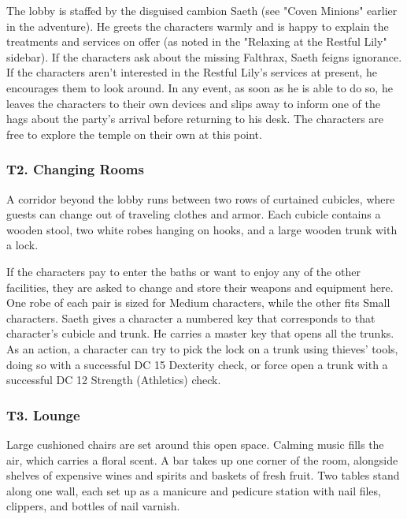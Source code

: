 \documentclass[10pt,a4paper,twoside,bg=print,twocolumn,openany,nodeprecatedcode]{dndbook}
\begin{document}
The lobby is staffed by the disguised cambion Saeth (see "Coven Minions" earlier in the adventure). He greets the characters warmly and is happy to explain the treatments and services on offer (as noted in the "Relaxing at the Restful Lily" sidebar). If the characters ask about the missing Falthrax, Saeth feigns ignorance. If the characters aren't interested in the Restful Lily's services at present, he encourages them to look around. In any event, as soon as he is able to do so, he leaves the characters to their own devices and slips away to inform one of the hags about the party's arrival before returning to his desk. The characters are free to explore the temple on their own at this point.

\subsubsection{T2. Changing Rooms}
\begin{DndReadAloud}{}
A corridor beyond the lobby runs between two rows of curtained cubicles, where guests can change out of traveling clothes and armor. Each cubicle contains a wooden stool, two white robes hanging on hooks, and a large wooden trunk with a lock.

\end{DndReadAloud}

If the characters pay to enter the baths or want to enjoy any of the other facilities, they are asked to change and store their weapons and equipment here. One robe of each pair is sized for Medium characters, while the other fits Small characters. Saeth gives a character a numbered key that corresponds to that character's cubicle and trunk. He carries a master key that opens all the trunks. As an action, a character can try to pick the lock on a trunk using thieves' tools, doing so with a successful DC 15 Dexterity check, or force open a trunk with a successful DC 12 Strength (Athletics) check.

\subsubsection{T3. Lounge}
\begin{DndReadAloud}{}
Large cushioned chairs are set around this open space. Calming music fills the air, which carries a floral scent. A bar takes up one corner of the room, alongside shelves of expensive wines and spirits and baskets of fresh fruit. Two tables stand along one wall, each set up as a manicure and pedicure station with nail files, clippers, and bottles of nail varnish.

\end{DndReadAloud}
\end{document}
